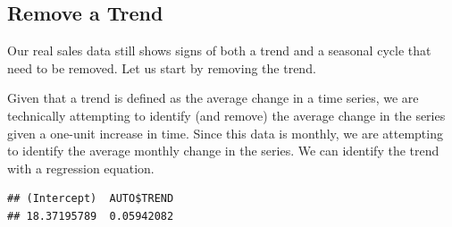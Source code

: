 \documentclass[
]{book}
\newenvironment{Shaded}{\begin{snugshade}}{\end{snugshade}}
\newcommand{\AttributeTok}[1]{\textcolor[rgb]{0.13,0.29,0.53}{#1}}
\newcommand{\DecValTok}[1]{\textcolor[rgb]{0.00,0.00,0.81}{#1}}
\newcommand{\FunctionTok}[1]{\textcolor[rgb]{0.13,0.29,0.53}{\textbf{#1}}}
\newcommand{\NormalTok}[1]{#1}
\newcommand{\OtherTok}[1]{\textcolor[rgb]{0.56,0.35,0.01}{#1}}
\newcommand{\SpecialCharTok}[1]{\textcolor[rgb]{0.81,0.36,0.00}{\textbf{#1}}}
\begin{document}
\subsection*{Remove a Trend}\label{remove-a-trend}

Our real sales data still shows signs of both a trend and a seasonal cycle that need to be removed. Let us start by removing the trend.

Given that a trend is defined as the average change in a time series, we are technically attempting to identify (and remove) the average change in the series given a one-unit increase in time. Since this data is monthly, we are attempting to identify the average monthly change in the series. We can identify the trend with a regression equation.

\begin{Shaded}
\end{Shaded}

\begin{verbatim}
## (Intercept)  AUTO$TREND 
## 18.37195789  0.05942082
\end{verbatim}
\end{document}
